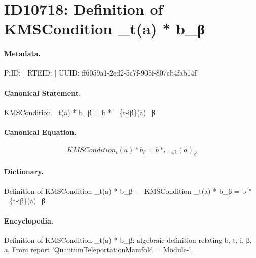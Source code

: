 \section*{ID10718: Definition of KMSCondition \_t(a) * b\_β}
\paragraph{Metadata.}
PiID:  | RTEID:  | UUID: ff6059a1-2ed2-5c7f-905f-807cb4fab14f

\paragraph{Canonical Statement.}
KMSCondition \_t(a) * b\_β = b * \_\{t-iβ\}(a)\_β

\paragraph{Canonical Equation.}
\[
KMSCondition  _t(a) * b_β = b * _{t-iβ}(a)_β
\]

\paragraph{Dictionary.}
Definition of KMSCondition \_t(a) * b\_β — KMSCondition  \_t(a) * b\_β = b * \_\{t-iβ\}(a)\_β

\paragraph{Encyclopedia.}
Definition of KMSCondition \_t(a) * b\_β: algebraic definition relating b, t, i, β, a. From report 'QuantumTeleportationManifold = Module-'.
